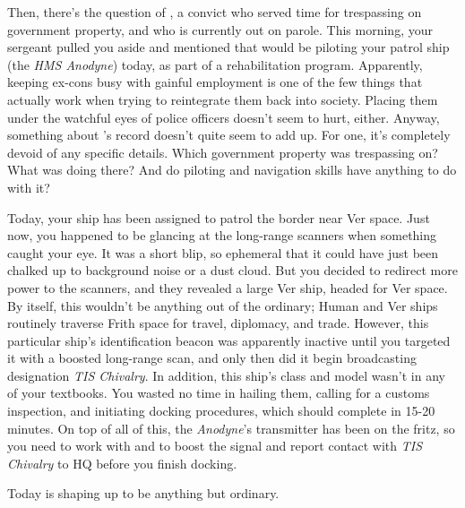\documentclass[char]{guildcamp4}
\begin{document}
Then, there's the question of \cPilot{}, a convict who served time for trespassing on government property, and who is currently out on parole. This morning, your sergeant pulled you aside and mentioned that \cPilot{} would be piloting your patrol ship (the \emph{HMS Anodyne}) today, as part of a rehabilitation program. Apparently, keeping ex-cons busy with gainful employment is one of the few things that actually work when trying to reintegrate them back into society. Placing them under the watchful eyes of police officers doesn't seem to hurt, either. Anyway, something about \cPilot{}'s record doesn't quite seem to add up. For one, it's completely devoid of any specific details. Which government property was \cPilot{\they} trespassing on? What was \cPilot{\they} doing there? And do \cPilot{\their} piloting and navigation skills have anything to do with it?

Today, your ship has been assigned to patrol the border near Ver space. Just now, you happened to be glancing at the long-range scanners when something caught your eye. It was a short blip, so ephemeral that it could have just been chalked up to background noise or a dust cloud. But you decided to redirect more power to the scanners, and they revealed a large Ver ship, headed for Ver space. By itself, this wouldn't be anything out of the ordinary; Human and Ver ships routinely traverse Frith space for travel, diplomacy, and trade. However, this particular ship's identification beacon was apparently inactive until you targeted it with a boosted long-range scan, and only then did it begin broadcasting designation \emph{TIS Chivalry}. In addition, this ship's class and model wasn't in any of your textbooks. You wasted no time in hailing them, calling for a customs inspection, and initiating docking procedures, which should complete in 15-20 minutes. On top of all of this, the \emph{Anodyne}'s transmitter has been on the fritz, so you need to work with \cCbad{} and \cPilot{} to boost the signal and report contact with \emph{TIS Chivalry} to HQ before you finish docking.

Today is shaping up to be anything but ordinary.
\end{document}
